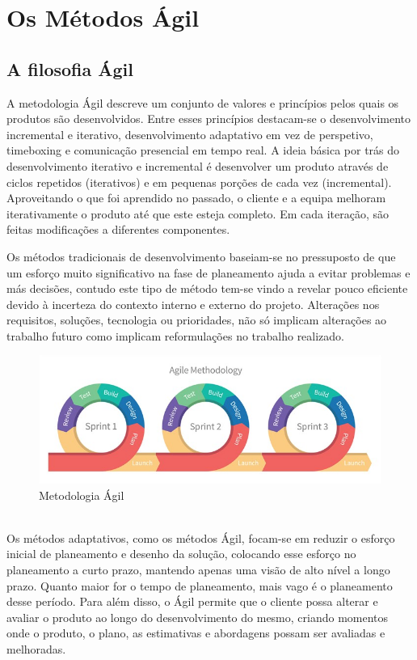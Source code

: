 \chapter{Os Métodos Ágil}
\label{cht:stateoftheart}

\section{A filosofia Ágil}

A metodologia Ágil descreve um conjunto de valores e princípios pelos quais os produtos são desenvolvidos. Entre esses princípios destacam-se o desenvolvimento incremental e iterativo, desenvolvimento adaptativo em vez de perspetivo, timeboxing e comunicação presencial em tempo real.
A ideia básica por trás do desenvolvimento iterativo e incremental é desenvolver um produto através de ciclos repetidos (iterativos) e em pequenas porções de cada vez (incremental). Aproveitando o que foi aprendido no passado, o cliente e a equipa melhoram iterativamente o produto até que este esteja completo. Em cada iteração, são feitas modificações a diferentes componentes.


Os métodos tradicionais de desenvolvimento baseiam-se no pressuposto de que um esforço muito significativo na fase de planeamento ajuda a evitar problemas e más decisões, contudo este tipo de método tem-se vindo a revelar pouco eficiente devido à incerteza do contexto interno e externo do projeto. Alterações nos requisitos, soluções, tecnologia ou prioridades, não só implicam alterações ao trabalho futuro como implicam reformulações no trabalho realizado.
\\
\begin{figure}[H]
    \centering
    \includegraphics[scale=0.7]{Imagens/agil.jpg}
    \caption{Metodologia Ágil}
    \label{fig:agil}
\end{figure}
\\
Os métodos adaptativos, como os métodos Ágil, focam-se em reduzir o esforço inicial de planeamento e desenho da solução, colocando esse esforço no planeamento a curto prazo, mantendo apenas uma visão de alto nível a longo prazo. Quanto maior for o tempo de planeamento, mais vago é o planeamento desse período. Para além disso, o Ágil permite que o cliente possa alterar e avaliar o produto ao longo do desenvolvimento do mesmo, criando momentos onde o produto, o plano, as estimativas e abordagens possam ser avaliadas e melhoradas.


